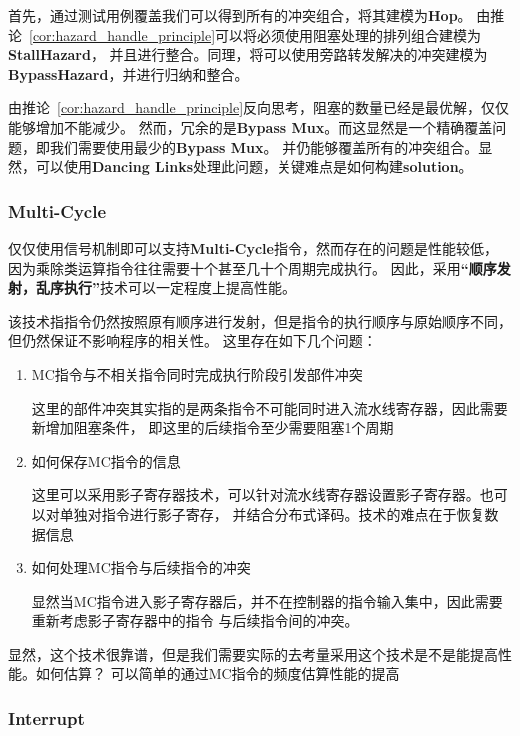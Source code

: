 \documentclass[hyperref,UTF8]{ctexart}
\theoremstyle{definition}
\theoremstyle{remark}
\numberwithin{equation}{subsection}
\newcommand{\Emph}{\textbf}
\begin{document}
	首先，通过测试用例覆盖我们可以得到所有的冲突组合，将其建模为\Emph{Hop}。
	由推论~\ref{cor:hazard_handle_principle}可以将必须使用阻塞处理的排列组合建模为\Emph{StallHazard}，
	并且进行整合。同理，将可以使用旁路转发解决的冲突建模为\Emph{BypassHazard}，并进行归纳和整合。
	
	由推论~\ref{cor:hazard_handle_principle}反向思考，阻塞的数量已经是最优解，仅仅能够增加不能减少。
	然而，冗余的是\Emph{Bypass Mux}。而这显然是一个精确覆盖问题，即我们需要使用最少的\Emph{Bypass Mux}。
	并仍能够覆盖所有的冲突组合。显然，可以使用\Emph{Dancing Links}处理此问题，关键难点是如何构建\Emph{solution}。
	
\subsubsection{Multi-Cycle}	

	仅仅使用信号机制即可以支持\Emph{Multi-Cycle}指令，然而存在的问题是性能较低，
	因为乘除类运算指令往往需要十个甚至几十个周期完成执行。
	因此，采用\Emph{“顺序发射，乱序执行”}技术可以一定程度上提高性能。
	
	该技术指指令仍然按照原有顺序进行发射，但是指令的执行顺序与原始顺序不同，但仍然保证不影响程序的相关性。
	这里存在如下几个问题：
	\begin{enumerate}[(1)]
		
		\item MC指令与不相关指令同时完成执行阶段引发部件冲突
		
		这里的部件冲突其实指的是两条指令不可能同时进入流水线寄存器，因此需要新增加阻塞条件，
		即这里的后续指令至少需要阻塞1个周期
		
		\item 如何保存MC指令的信息
		
		这里可以采用影子寄存器技术，可以针对流水线寄存器设置影子寄存器。也可以对单独对指令进行影子寄存，
		并结合分布式译码。技术的难点在于恢复数据信息
		
		\item 如何处理MC指令与后续指令的冲突
		
		显然当MC指令进入影子寄存器后，并不在控制器的指令输入集中，因此需要重新考虑影子寄存器中的指令
		与后续指令间的冲突。
		
	\end{enumerate}
	
	显然，这个技术很靠谱，但是我们需要实际的去考量采用这个技术是不是能提高性能。如何估算？
	可以简单的通过MC指令的频度估算性能的提高

\subsubsection{Interrupt}	
\end{document}

